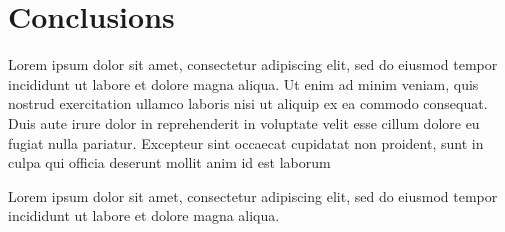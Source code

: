 \documentclass[bgd, online, hvmath]{style/copernicus}
\begin{document}
\section{Conclusions}\label{conclusions}

Lorem ipsum dolor sit amet, consectetur adipiscing elit, sed do eiusmod
tempor incididunt ut labore et dolore magna aliqua. Ut enim ad minim
veniam, quis nostrud exercitation ullamco laboris nisi ut aliquip ex ea
commodo consequat. Duis aute irure dolor in reprehenderit in voluptate
velit esse cillum dolore eu fugiat nulla pariatur. Excepteur sint
occaecat cupidatat non proident, sunt in culpa qui officia deserunt
mollit anim id est laborum

\begin{acknowledgements}
Lorem ipsum dolor sit amet, consectetur adipiscing elit, sed do eiusmod
tempor incididunt ut labore et dolore magna aliqua.
\end{acknowledgements}


\end{document}
